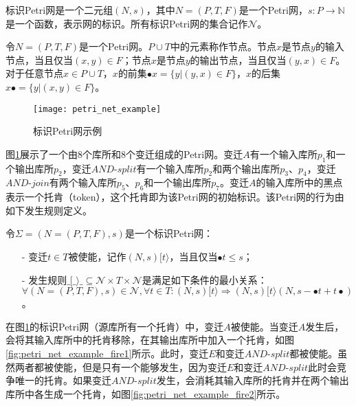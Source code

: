 \begin{definition}[标识Petri网]\label{def:marked_petrinet}
标识Petri网是一个二元组$(N,s)$，其中$N=(P,T,F)$是一个Petri网，$s:P\rightarrow\mathbb{N}$是一个函数，表示网的标识。所有标识Petri网的集合记作$\mathcal{N}$。
\end{definition}

令$N=(P,T,F)$是一个Petri网。$P\cup T$中的元素称作节点。节点$x$是节点$y$的输入节点，当且仅当$(x,y)\in F$；节点$x$是节点$y$的输出节点，当且仅当$(y,x)\in F$。对于任意节点$x\in P\cup T$，$x$的前集$\bullet x=\{y|(y,x)\in F\}$，$x$的后集$x\bullet=\{y|(x,y)\in F\}$。

\begin{figure}[htbp]
  \centering
  \texttt{[image: petri\_net\_example]}
  \caption{标识Petri网示例\label{fig:petri_net_example}}
\end{figure}

图\ref{fig:petri_net_example}展示了一个由8个库所和8个变迁组成的Petri网。变迁$A$有一个输入库所$p_{1}$和一个输出库所$p_{2}$，变迁$AND$-$split$有一个输入库所$p_{2}$和两个输出库所$p_{3}$、$p_{4}$，变迁$AND$-$join$有两个输入库所$p_{5}$、$p_{6}$和一个输出库所$p_{7}$。变迁$A$的输入库所中的黑点表示一个托肯（token），这个托肯即为该Petri网的初始标识。该Petri网的行为由如下发生规则定义。

\begin{definition}[发生规则]\label{def:firing_rule}
令$\Sigma=(N=(P,T,F),s)$是一个标识Petri网：
  \begin{itemize}
  	\item[-] 变迁$t\in T$被使能，记作$(N,s)[t\rangle$，当且仅当$\bullet t\leq s$；
  	\item[-] 发生规则$\_[\_\rangle\_\subseteq\mathcal{N}\times T\times\mathcal{N}$是满足如下条件的最小关系：\\$\forall (N=(P,T,F),s)\in\mathcal{N},\forall t\in T:(N,s)[t\rangle\Rightarrow(N,s)[t\rangle(N,s-\bullet t+t\bullet)$。
  \end{itemize}
\end{definition}

在图\ref{fig:petri_net_example}的标识Petri网（源库所有一个托肯）中，变迁$A$被使能。当变迁$A$发生后，会将其输入库所中的托肯移除，在其输出库所中加入一个托肯，如图\ref{fig:petri_net_example_fire1}所示。此时，变迁$E$和变迁$AND$-$split$都被使能。虽然两者都被使能，但是只有一个能够发生，因为变迁$E$和变迁$AND$-$split$此时会竞争唯一的托肯。如果变迁$AND$-$split$发生，会消耗其输入库所的托肯并在两个输出库所中各生成一个托肯，如图\ref{fig:petri_net_example_fire2}所示。


